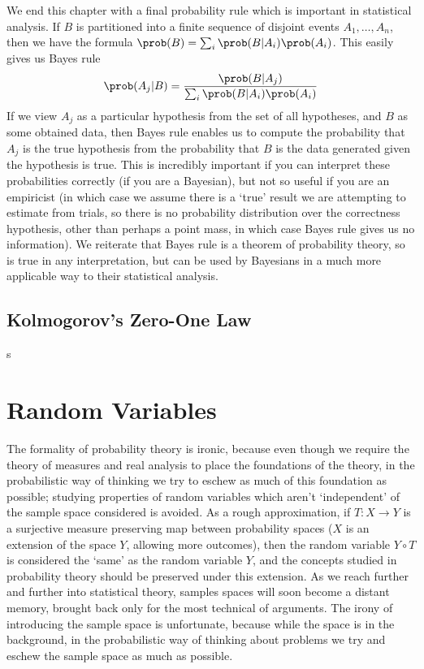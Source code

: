We end this chapter with a final probability rule which is important in statistical analysis. If $B$ is partitioned into a finite sequence of disjoint events $A_1, \dots, A_n$, then we have the formula $\prob(B) = \sum_i \prob(B | A_i) \prob(A_i)$. This easily gives us Bayes rule
%
\[ \prob(A_j | B) = \frac{\prob(B | A_j)}{\sum_i \prob(B | A_i) \prob(A_i)} \]
%
If we view $A_j$ as a particular hypothesis from the set of all hypotheses, and $B$ as some obtained data, then Bayes rule enables us to compute the probability that $A_j$ is the true hypothesis from the probability that $B$ is the data generated given the hypothesis is true. This is incredibly important if you can interpret these probabilities correctly (if you are a Bayesian), but not so useful if you are an empiricist (in which case we assume there is a `true' result we are attempting to estimate from trials, so there is no probability distribution over the correctness hypothesis, other than perhaps a point mass, in which case Bayes rule gives us no information). We reiterate that Bayes rule is a theorem of probability theory, so is true in any interpretation, but can be used by Bayesians in a much more applicable way to their statistical analysis.

\section{Kolmogorov's Zero-One Law}

s

\chapter{Random Variables}

The formality of probability theory is ironic, because even though we require the theory of measures and real analysis to place the foundations of the theory, in the probabilistic way of thinking we try to eschew as much of this foundation as possible; studying properties of random variables which aren't `independent' of the sample space considered is avoided. As a rough approximation, if $T: X \to Y$ is a surjective measure preserving map between probability spaces ($X$ is an extension of the space $Y$, allowing more outcomes), then the random variable $Y \circ T$ is considered the `same' as the random variable $Y$, and the concepts studied in probability theory should be preserved under this extension. As we reach further and further into statistical theory, samples spaces will soon become a distant memory, brought back only for the most technical of arguments. The irony of introducing the sample space is unfortunate, because while the space is in the background, in the probabilistic way of thinking about problems we try and eschew the sample space as much as possible.

